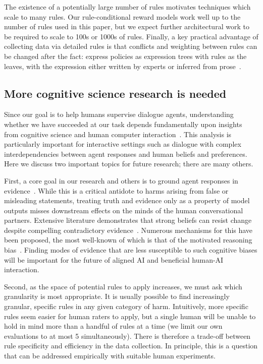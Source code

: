 The existence of a potentially large number of rules motivates techniques which scale to many rules. Our rule-conditional reward models work well up to the number of rules used in this paper, but we expect further architectural work to be required to scale to 100s or 1000s of rules. Finally, a key practical advantage of collecting data via detailed rules is that conflicts and weighting between rules can be changed after the fact: \citet{saeidi2021cross} express policies as expression trees with rules as the leaves, with the expression either written by experts or inferred from prose~\citep{kotonya2022policy}.

\subsection{More cognitive science research is needed} \label{sub:cognitive-science}

Since our goal is to help humans supervise dialogue agents, understanding whether we have succeeded at our task depends fundamentally upon insights from cognitive science and human computer interaction~\citep{irving2019social}. This analysis is particularly important for interactive settings such as dialogue with complex interdependencies between agent responses and human beliefs and preferences. Here we discuss two important topics for future research; there are many others.

First, a core goal in our research and others is to ground agent responses in evidence~\citep{evans2021truthful}. While this is a critical antidote to harms arising from false or misleading statements, treating truth and evidence only as a property of model outputs misses downstream effects on the minds of the human conversational partners. Extensive literature demonstrates that strong beliefs can resist change despite compelling contradictory evidence~\citep{gershman2019}. Numerous mechanisms for this have been proposed, the most well-known of which is that of the motivated reasoning bias~\citep{kunda1990}. Finding modes of evidence that are less susceptible to such cognitive biases will be important for the future of aligned AI and beneficial human-AI interaction.

Second, as the space of potential rules to apply increases, we must ask which granularity is most appropriate. It is usually possible to find increasingly granular, specific rules in any given category of harm. Intuitively, more specific rules seem easier for human raters to apply, but a single human will be unable to hold in mind more than a handful of rules at a time (we limit our own evaluations to at most 5 simultaneously). There is therefore a trade-off between rule specificity and efficiency in the data collection. In principle, this is a question that can be addressed empirically with suitable human experiments.

